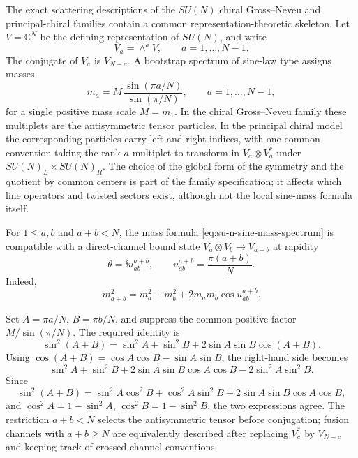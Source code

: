 The exact scattering descriptions of the \(SU(N)\) chiral Gross--Neveu and
principal-chiral families contain a common representation-theoretic skeleton.
Let \(V=\mathbb C^N\) be the defining representation of \(SU(N)\), and write
\[
  V_a=\wedge^a V,\qquad a=1,\ldots,N-1 .
\]
The conjugate of \(V_a\) is \(V_{N-a}\).  A bootstrap spectrum of
sine-law type assigns masses
\begin{equation}
  m_a=M\,\frac{\sin(\pi a/N)}{\sin(\pi/N)},
  \qquad
  a=1,\ldots,N-1 ,
  \label{eq:su-n-sine-mass-spectrum}
\end{equation}
for a single positive mass scale \(M=m_1\).  In the chiral Gross--Neveu
family these multiplets are the antisymmetric tensor particles.  In the
principal chiral model the corresponding particles carry left and right
indices, with one common convention taking the rank-\(a\) multiplet to
transform in \(V_a\otimes V_a^\ast\) under \(SU(N)_L\times SU(N)_R\).  The
choice of the global form of the symmetry and the quotient by common centers
is part of the family specification; it affects which line operators and twisted
sectors exist, although not the local sine-mass formula itself.

\begin{remark}
\label{rem:su-n-sine-mass-fusing-angle}
For \(1\le a,b\) and \(a+b<N\), the mass formula
\eqref{eq:su-n-sine-mass-spectrum} is compatible with a direct-channel bound
state \(V_a\otimes V_b\to V_{a+b}\) at rapidity
\begin{equation}
  \theta=\ii u_{ab}^{a+b},\qquad
  u_{ab}^{a+b}=\frac{\pi(a+b)}{N}.
  \label{eq:su-n-fusing-angle}
\end{equation}
Indeed,
\begin{equation}
  m_{a+b}^2
  =
  m_a^2+m_b^2+2m_am_b\cos u_{ab}^{a+b}.
  \label{eq:su-n-sine-mass-fusion-identity}
\end{equation}
\end{remark}

Set \(A=\pi a/N\), \(B=\pi b/N\), and suppress the common positive factor
\(M/\sin(\pi/N)\).  The required identity is
\begin{equation}
  \sin^2(A+B)
  =
  \sin^2A+\sin^2B+2\sin A\sin B\cos(A+B).
  \label{eq:su-n-trig-fusion-identity}
\end{equation}
Using \(\cos(A+B)=\cos A\cos B-\sin A\sin B\), the right-hand side becomes
\[
  \sin^2A+\sin^2B+2\sin A\sin B\cos A\cos B
  -2\sin^2A\sin^2B .
\]
Since
\[
  \sin^2(A+B)
  =
  \sin^2A\cos^2B+\cos^2A\sin^2B
  +2\sin A\sin B\cos A\cos B ,
\]
and \(\cos^2A=1-\sin^2A\), \(\cos^2B=1-\sin^2B\), the two expressions agree.
The restriction \(a+b<N\) selects the antisymmetric tensor before conjugation;
fusion channels with \(a+b\ge N\) are equivalently described after replacing
\(V_c^\ast\) by \(V_{N-c}\) and keeping track of crossed-channel conventions.

